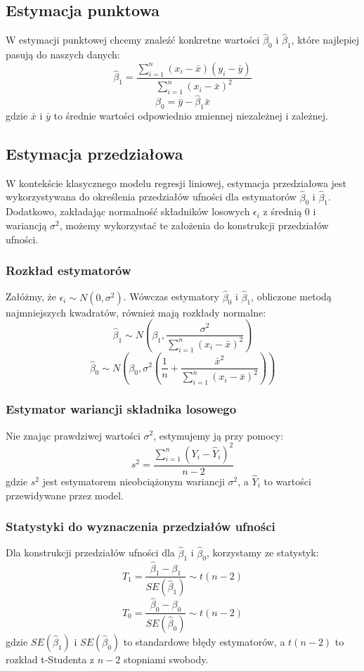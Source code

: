 \documentclass{article}
\begin{document}
\subsection{Estymacja punktowa}
W estymacji punktowej chcemy znaleźć konkretne wartości \( \hat{\beta}_0 \) i \( \hat{\beta}_1 \), które najlepiej pasują do naszych danych:
\[ \hat{\beta}_1 = \frac{\sum_{i=1}^{n}(x_i - \bar{x})(y_i - \bar{y})}{\sum_{i=1}^{n}(x_i - \bar{x})^2} \]
\[ \hat{\beta}_0 = \bar{y} - \hat{\beta}_1\bar{x} \]
gdzie \( \bar{x} \) i \( \bar{y} \) to średnie wartości odpowiednio zmiennej niezależnej i zależnej.

\subsection{Estymacja przedziałowa}
W kontekście klasycznego modelu regresji liniowej, estymacja przedziałowa jest wykorzystywana do określenia przedziałów ufności dla estymatorów \(\hat{\beta}_0\) i \(\hat{\beta}_1\). Dodatkowo, zakładając normalność składników losowych \(\epsilon_i\) z średnią 0 i wariancją \(\sigma^2\), możemy wykorzystać te założenia do konstrukcji przedziałów ufności.

\subsubsection{Rozkład estymatorów}
Załóżmy, że \(\epsilon_i \sim N(0, \sigma^2)\). Wówczas estymatory \(\hat{\beta}_0\) i \(\hat{\beta}_1\), obliczone metodą najmniejszych kwadratów, również mają rozkłady normalne:
\[\hat{\beta}_1 \sim N\left(\beta_1, \frac{\sigma^2}{\sum_{i=1}^{n}(x_i-\bar{x})^2}\right)\]
\[\hat{\beta}_0 \sim N\left(\beta_0, \sigma^2\left(\frac{1}{n} + \frac{\bar{x}^2}{\sum_{i=1}^{n}(x_i-\bar{x})^2}\right)\right)\]

\subsubsection{Estymator wariancji składnika losowego}
Nie znając prawdziwej wartości \(\sigma^2\), estymujemy ją przy pomocy:
\[s^2 = \frac{\sum_{i=1}^{n}(Y_i - \hat{Y}_i)^2}{n-2}\]
gdzie \(s^2\) jest estymatorem nieobciążonym wariancji \(\sigma^2\), a \(\hat{Y}_i\) to wartości przewidywane przez model.

\subsubsection{Statystyki do wyznaczenia przedziałów ufności}
Dla konstrukcji przedziałów ufności dla \(\hat{\beta}_1\) i \(\hat{\beta}_0\), korzystamy ze statystyk:
\[T_1 = \frac{\hat{\beta}_1 - \beta_1}{SE(\hat{\beta}_1)} \sim t(n-2)\]
\[T_0 = \frac{\hat{\beta}_0 - \beta_0}{SE(\hat{\beta}_0)} \sim t(n-2)\]
gdzie \(SE(\hat{\beta}_1)\) i \(SE(\hat{\beta}_0)\) to standardowe błędy estymatorów, a \(t(n-2)\) to rozkład t-Studenta z \(n-2\) stopniami swobody.
\end{document}
